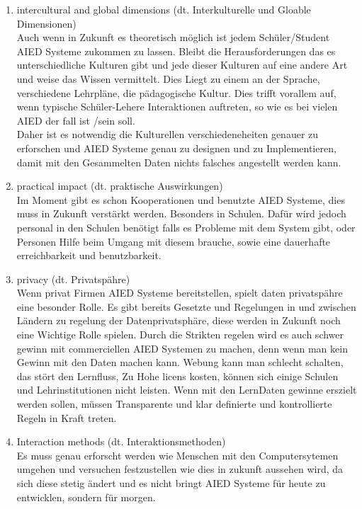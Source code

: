 \begin{enumerate}
    \item intercultural and global dimensions (dt. Interkulturelle und Gloable Dimensionen) \\Auch wenn in Zukunft es theoretisch möglich ist jedem Schüler/Student AIED Systeme zukommen zu lassen.
    Bleibt die Herausforderungen das es unterschiedliche Kulturen gibt und jede dieser Kulturen auf eine andere Art und weise das Wissen vermittelt. Dies Liegt zu einem an der Sprache, 
    verschiedene Lehrpläne, die pädagogische Kultur. Dies trifft vorallem auf, wenn typische Schüler-Lehere Interaktionen auftreten, so wie es bei vielen AIED der fall ist /sein soll.
    \\
    Daher ist es notwendig die Kulturellen verschiedeneheiten genauer zu erforschen und AIED Systeme genau zu designen und zu Implementieren, damit mit den Gesammelten Daten nichts falsches angestellt werden kann.

    
    \item practical impact (dt. praktische Auswirkungen) \\
    Im Moment gibt es schon Kooperationen und benutzte AIED Systeme, dies muss in Zukunft verstärkt werden. Besonders in Schulen. Dafür wird jedoch personal in den Schulen benötigt
 falls es Probleme mit dem System gibt, oder Personen Hilfe beim Umgang mit diesem brauche, sowie eine dauerhafte erreichbarkeit und benutzbarkeit.


    \item privacy (dt. Privatspähre) \\
    Wenn privat Firmen AIED Systeme bereitstellen, spielt daten privatspähre eine besonder Rolle. Es gibt bereits Gesetzte und Regelungen in und zwischen Ländern zu regelung der Datenprivatsphäre, diese 
    werden in Zukunft noch eine Wichtige Rolle spielen. Durch die Strikten regelen wird es auch schwer gewinn mit commerciellen AIED Systemen zu machen, denn wenn man kein Gewinn mit den Daten machen kann. Webung kann man schlecht schalten, das stört den Lernfluss,
    Zu Hohe licens kosten, können sich einige Schulen und Lehrinstitutionen nicht leisten. Wenn mit den LernDaten gewinne erszielt werden sollen, müssen Transparente und klar definierte und kontrollierte Regeln in Kraft treten.
   
    \item Interaction methods (dt. Interaktionsmethoden) \\
    Es muss genau erforscht werden wie Menschen mit den Computersytemen umgehen und versuchen festzustellen wie dies in zukunft aussehen wird, da sich diese stetig ändert und es nicht bringt
 AIED Systeme für heute zu entwicklen, sondern für morgen.


\end{enumerate}
